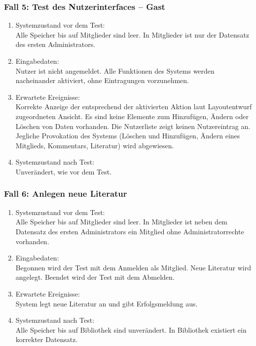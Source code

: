 \subsubsection{Fall 5: Test des Nutzerinterfaces -- Gast}
\begin{enumerate}
\item Systemzustand vor dem Test:\\
	Alle Speicher bis auf Mitglieder sind leer. In Mitglieder ist nur der Datensatz des ersten Administrators.
\item Eingabedaten:\\
	Nutzer ist nicht angemeldet. Alle Funktionen des Systems werden nacheinander aktiviert, ohne Eintragungen vorzunehmen.
\item Erwartete Ereignisse:\\
	Korrekte Anzeige der entsprechend der aktivierten Aktion laut Layoutentwurf zugeordneten Ansicht. Es sind keine Elemente zum Hinzufügen, Ändern oder Löschen von Daten vorhanden. Die Nutzerliste zeigt keinen Nutzereintrag an. Jegliche Provokation des Systems (Löschen und Hinzufügen, Ändern eines Mitglieds, Kommentars, Literatur) wird abgewiesen.
\item Systemzustand nach Test:\\
	Unverändert, wie vor dem Test.
\end{enumerate}

\subsubsection{Fall 6: Anlegen neue Literatur}
\begin{enumerate}
\item Systemzustand vor dem Test:\\
	Alle Speicher bis auf Mitglieder sind leer. In Mitglieder ist neben dem Datensatz des ersten Administrators ein Mitglied ohne Administratorrechte vorhanden.
\item Eingabedaten:\\
	Begonnen wird der Test mit dem Anmelden als Mitglied. Neue Literatur wird angelegt. Beendet wird der Test mit dem Abmelden.
\item Erwartete Ereignisse:\\
	System legt neue Literatur an und gibt Erfolgsmeldung aus.
\item Systemzustand nach Test:\\
	Alle Speicher bis auf Bibliothek sind unverändert. In Bibliothek existiert ein korrekter Datensatz.
\end{enumerate}

